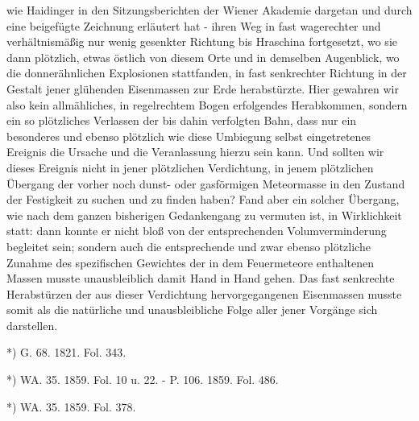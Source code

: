 \documentclass[a4paper, 8pt, oneside, polutonikogreek, german]{article}
\begin{document}
wie Haidinger in den Sitzungsberichten der Wiener Akademie dargetan und durch eine beigefügte Zeichnung erläutert hat - ihren Weg in fast wagerechter und verhältnismäßig nur wenig gesenkter Richtung bis Hraschina fortgesetzt, wo sie dann plötzlich, etwas östlich von diesem Orte und in demselben Augenblick, wo die donnerähnlichen Explosionen stattfanden, in fast senkrechter Richtung in der Gestalt jener glühenden Eisenmassen zur Erde herabstürzte. Hier gewahren wir also kein allmähliches, in regelrechtem Bogen erfolgendes Herabkommen, sondern ein so plötzliches Verlassen der bis dahin verfolgten Bahn, dass nur ein besonderes und ebenso plötzlich wie diese Umbiegung selbst eingetretenes Ereignis die Ursache und die Veranlassung hierzu sein kann. Und sollten wir dieses Ereignis nicht in jener plötzlichen Verdichtung, in jenem plötzlichen Übergang der vorher noch dunst- oder gasförmigen Meteormasse in den Zustand der Festigkeit zu suchen und zu finden haben? Fand aber ein solcher Übergang, wie nach dem ganzen bisherigen Gedankengang zu vermuten ist, in Wirklichkeit statt: dann konnte er nicht bloß von der entsprechenden Volumverminderung begleitet sein; sondern auch die entsprechende und zwar ebenso plötzliche Zunahme des spezifischen Gewichtes der in dem Feuermeteore enthaltenen Massen musste unausbleiblich damit Hand in Hand gehen. Das fast senkrechte Herabstürzen der aus dieser Verdichtung hervorgegangenen Eisenmassen musste somit als die natürliche und unausbleibliche Folge aller jener Vorgänge sich darstellen.

*) G. 68. 1821. Fol. 343.

*) WA. 35. 1859. Fol. 10 u. 22. - P. 106. 1859. Fol. 486.

*) WA. 35. 1859. Fol. 378.
\end{document}
